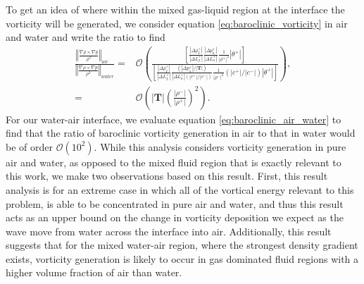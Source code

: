 \documentclass{article}
\newcommand{\bs}[1]{\boldsymbol{#1}}
\newcommand{\orderof}[1]{\ensuremath{\mathcal{O}\left(#1\right)}}
\newcommand{\abs}[1]{\ensuremath{\left|#1\right|}}
\newcommand{\norm}[1]{\ensuremath{\left\Vert#1\right\Vert}}
\begin{document}
To get an idea of where within the mixed gas-liquid region at the
interface the vorticity will be generated, we consider equation
\eqref{eq:baroclinic_vorticity} in air and water and write the ratio
to find
\begin{align}%
  \label{eq:baroclinic_air_water}%
  \frac{\norm{\frac{\nabla\rho\times\nabla p}{\rho^2}}_{air\quad}}{\norm{\frac{\nabla\rho\times\nabla p}{\rho^2}}_{water}}
  =&\orderof{\frac{\left[\frac{\abs{\Delta \rho_I^+}}{\abs{\Delta L_I^+}}\frac{\abs{\Delta p_a^+}}{\abs{\Delta L_a^+}}\frac{1}{\abs{\rho^+}^2}\abs{\theta^+}\right]}
     {\left[\frac{\abs{\Delta \rho_I^+}}{\abs{\Delta L_I^+}}\frac{\left(\abs{\Delta p_a^+}/\abs{\bs{T}}\right)}{\abs{\Delta L_a^+}\left(\abs{c^+}/\abs{c^-}\right)}\frac{1}{\abs{\rho^-}^2}\left(\abs{c^+}/\abs{c^-}\right)\abs{\theta^+}\right]}},\nonumber\\%
  =&\orderof{\abs{\bs{T}}\left(\frac{\abs{\rho^-}}{\abs{\rho^+}}\right)^2}.%
\end{align}
For our water-air interface, we evaluate equation
\eqref{eq:baroclinic_air_water} to find that the ratio of baroclinic
vorticity generation in air to that in water would be of order
$\orderof{10^2}$. While this analysis considers vorticity generation
in pure air and water, as opposed to the mixed fluid region that is
exactly relevant to this work, we make two observations based on this
result. First, this result analysis is for an extreme case in which
all of the vortical energy relevant to this problem, is able to be
concentrated in pure air and water, and thus this result acts as an
upper bound on the change in vorticity deposition we expect as the
wave move from water across the interface into air. Additionally, this
result suggests that for the mixed water-air region, where the
strongest density gradient exists, vorticity generation is likely to
occur in gas dominated fluid regions with a higher volume fraction of
air than water.
\end{document}
